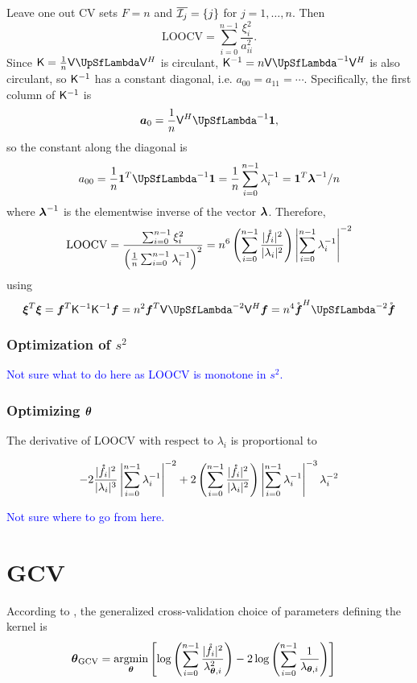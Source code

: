\documentclass{amsart}
\newcommand{\rvf}{\mathring{\vf}}
\begin{document}
Leave one out CV sets $F=n$ and $\overline{\mathcal{I}_j} = \{j\}$ for $j=1,\dots,n$. Then 
$$\mathrm{LOOCV} = \sum_{i=0}^{n-1} \frac{\xi_i^2}{a_{ii}^2}.$$
Since $\mK = \frac{1}{n} \mV \mLambda \mV^H$ is circulant, $\mK^{-1} = n \mV \mLambda^{-1} \mV^H$ is also circulant, so $\mathsf{K}^{-1}$ has a constant diagonal, i.e. $a_{00} = a_{11} = \cdots$. Specifically, the first column of $\mathsf{K}^{-1}$ is  
$$\va_0 = \frac{1}{n} \mV^H \mLambda^{-1} \boldsymbol{1},$$
so the constant along the diagonal is 
$$a_{00} = \frac{1}{n} \boldsymbol{1}^T \mLambda^{-1} \boldsymbol{1} = \frac{1}{n} \sum_{i=0}^{n-1} \lambda_i^{-1} = \boldsymbol{1}^T \vlambda^{-1}/n$$
where $\boldsymbol{\lambda}^{-1}$ is the elementwise inverse of the vector $\boldsymbol{\lambda}$. Therefore, 
$$\mathrm{LOOCV} = \frac{\sum_{i=0}^{n-1} \xi_i^2}{\left(\frac{1}{n} \sum_{i=0}^{n-1} \lambda_i^{-1}\right)^2} = n^6 \left(\sum_{i=0}^{n-1} \frac{\lvert \mathring{f}_i \rvert^2}{\lvert \lambda_i \rvert^2}\right) \left\lvert \sum_{i=0}^{n-1} \lambda_i^{-1}\right\rvert^{-2}$$
using 
$$\vxi^T \vxi = \vf^T \mK^{-1} \mK^{-1} \vf = n^2 \vf^T \mV \mLambda^{-2} \mV^H \vf = n^4 \rvf^H \mLambda^{-2} \rvf$$

\subsubsection{Optimization of $s^2$} 

\textcolor{blue}{Not sure what to do here as LOOCV is monotone in $s^2$.}

\subsubsection{Optimizing $\boldsymbol{\theta}$} 

The derivative of LOOCV with respect to $\lambda_i$ is proportional to 

$$-2 \frac{\lvert \mathring{f}_i \rvert^2}{\lvert \lambda_i \rvert^{3}} \left\lvert \sum_{i=0}^{n-1} \lambda_i^{-1}\right\rvert^{-2} +2 \left(\sum_{i=0}^{n-1} \frac{\lvert \mathring{f}_i \rvert^2}{\lvert \lambda_i \rvert^2}\right) \left\lvert \sum_{i=0}^{n-1} \lambda_i^{-1}\right\rvert^{-3} \lambda_i^{-2}$$

\textcolor{blue}{Not sure where to go from here.} 

\section{GCV}

According to \cite{RatHic19a}, the generalized cross-validation choice of parameters defining the kernel is
\begin{align*}
    \boldsymbol{\theta}_{\text{GCV}} 
    &= \operatorname*{argmin}_{\boldsymbol{\theta}} \left [\log\left( \sum_{i=0}^{n-1} \frac{\lvert\mathring{f}_i\rvert^2}{\lambda_{\boldsymbol{\theta},i}^2} \right)
    - 2 \log \left(\sum_{i=0}^{n-1} \frac{1}{\lambda_{\boldsymbol{\theta},i}} \right) \right ]
\end{align*}
\end{document}
